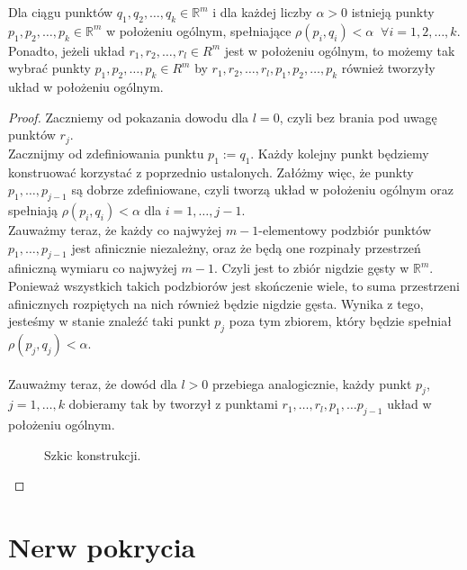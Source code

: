 \begin{twie}
    \label{twie:1_10_2}
    Dla ciągu punktów $q_1, q_2, \ldots, q_k\in \mathbb{R}^m$ i dla każdej liczby $\alpha>0$ istnieją punkty $p_1, p_2, \ldots , p_k\in \mathbb{R}^m$ w położeniu ogólnym, spełniające $\rho (p_i, q_i)<\alpha\;\; \forall i=1,2,\ldots,k$.\\
    Ponadto, jeżeli układ $r_1, r_2, \ldots , r_l\in R^m$ jest w położeniu ogólnym, to możemy tak wybrać punkty $p_1, p_2, \ldots , p_k\in R^m$ 
    by $r_1, r_2, \ldots , r_l, p_1, p_2, \ldots , p_k$ również tworzyły układ w położeniu ogólnym.
\end{twie}
\begin{proof}
    Zaczniemy od pokazania dowodu dla $l=0$, czyli bez brania pod uwagę punktów $r_j$. \\
    Zacznijmy od zdefiniowania punktu $p_1:=q_1$. Każdy kolejny punkt będziemy konstruować korzystać z poprzednio ustalonych. Załóżmy więc, że punkty $p_1, \ldots, p_{j-1}$ są dobrze zdefiniowane, czyli tworzą układ w położeniu ogólnym oraz spełniają $\rho(p_i, q_i)<\alpha$ dla $i=1, \ldots, j-1$.\\
    Zauważmy teraz, że każdy co najwyżej $m-1$-elementowy podzbiór punktów $p_1, \ldots, p_{j-1}$ jest afinicznie niezależny, oraz że będą one rozpinały przestrzeń afiniczną wymiaru co najwyżej $m-1$. Czyli jest to zbiór nigdzie gęsty w $\mathbb{R}^m$. Ponieważ wszystkich takich podzbiorów jest skończenie wiele, to suma przestrzeni afinicznych rozpiętych na nich również będzie nigdzie gęsta. Wynika z tego, jesteśmy w stanie znaleźć taki punkt $p_j$ poza tym zbiorem, który będzie spełniał $\rho (p_j, q_j)<\alpha$.\\
    \\
    Zauważmy teraz, że dowód dla $l>0$ przebiega analogicznie, każdy punkt $p_j$, $j=1, \ldots, k$ dobieramy tak by tworzył z punktami $r_1, \ldots, r_l, p_1, \ldots p_{j-1}$ układ w położeniu ogólnym. 
    \begin{figure}[H]
        \centering
        
        \caption{Szkic konstrukcji.}
        \label{fig:szkic}
    \end{figure}
\end{proof}


\section{Nerw pokrycia}

